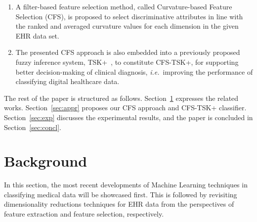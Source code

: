 \documentclass{article}
\newcommand{\zzie}{\emph{i.e.}~}
\newcommand*{\1}{\textcolor{magenta}}
\begin{document}
	\begin{enumerate}
		\item A filter-based feature selection method, called Curvature-based Feature Selection (CFS), is proposed to select discriminative attributes in line with the ranked and averaged curvature values for each dimension in the given EHR data set.
		
		\item The presented CFS approach is also embedded into a previously proposed fuzzy inference system, TSK+~\cite{Jie2017,li2018extended}, to constitute CFS-TSK+, for supporting better decision-making of clinical diagnosis, \zzie improving the performance of classifying digital healthcare data.
	\end{enumerate}
	
	The rest of the paper is structured as follows. Section~\ref{sec:bg} expresses the related works. Section~\ref{sec:appr} proposes our CFS approach and CFS-TSK+ classifier. Section~\ref{sec:exp} discusses the experimental results, and the paper is concluded in Section~\ref{sec:concl}.
	
	\section{Background}\label{sec:bg}
	In this section, the most recent developments of Machine Learning techniques in classifying medical data will be showcased first. This is followed by revisiting dimensionality reductions techniques for EHR data from the perspectives of feature extraction and feature selection, respectively.
	
\end{document}
